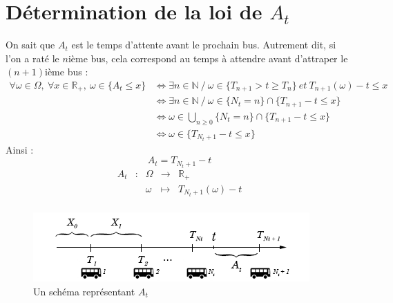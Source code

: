 \documentclass[a4paper, titlepage]{livret} %
\begin{document}
		\section{Détermination de la loi de $A_{t}$}
			On sait que $A_{t}$ est le temps d'attente avant le prochain bus.
			Autrement dit, si l'on a raté le $n$ième bus, cela correspond au temps à attendre avant d'attraper le $(n+1)$ième bus :
			\[\begin{aligned}
				\forall \omega \in \Omega,\  \forall x \in \mathbb{R}_{+}, \ \omega \in \{A_{t} \leq x\} & \Leftrightarrow \exists n \in \mathbb{N}\ / \ \omega \in \{T_{n+1} > t \geq T_{n}\} \ et \ T_{n+1}(\omega) - t \leq x\\
																										 & \Leftrightarrow \exists n \in \mathbb{N}\ / \ \omega \in \{N_{t} = n\} \cap \{T_{n+1} - t \leq x\}\\
																										 & \Leftrightarrow \omega \in \bigcup_{n \geq 0} \{N_{t} = n\} \cap \{T_{n+1} - t \leq x\}\\
																										 & \Leftrightarrow \omega \in \{T_{N_{t}+1} - t \leq x\}
			\end{aligned}\]
			Ainsi :
			\[\boxed{
				A_{t} = T_{N_{t}+1} - t
			}\]
			\[\begin{array}{ccccc}
				A_{t} & : & \Omega & \to & \mathbb{R}_{+} \\
					  &   & \omega & \mapsto & T_{N_{t}+1}(\omega) - t\\
			\end{array}\]

			\begin{figure}[!ht]
				\centering
  					\includegraphics[scale=0.6]{g3.png}
  					\caption{Un schéma représentant $A_{t}$}
			\end{figure}
\end{document}
